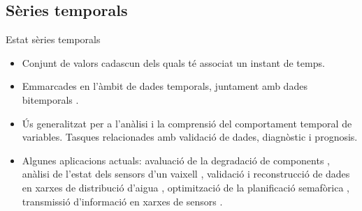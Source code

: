 \subsection{Sèries temporals}
\begin{frame}{Estat sèries temporals}

  \begin{itemize}

  \item Conjunt de valors cadascun dels quals té associat un instant
    de temps.

  \item Emmarcades en l'àmbit de dades temporals, juntament amb dades
    bitemporals \parencite{assfalg08:thesis}.

  \item Ús generalitzat per a l'anàlisi i la comprensió del
    comportament temporal de variables. Tasques relacionades amb
    validació de dades, diagnòstic i prognosis.

  \item Algunes aplicacions actuals: avaluació de la degradació de
    components \parencite{yu11}, anàlisi de l'estat dels sensors d'un
    vaixell \parencite{palmer07}, validació i reconstrucció de dades
    en xarxes de distribució d'aigua \parencite{quevedo10},
    optimització de la planificació semafòrica \parencite{last11},
    transmissió d'informació en xarxes de
    sensors \parencite{jainagrawal05}.


  \end{itemize}

\end{frame}


